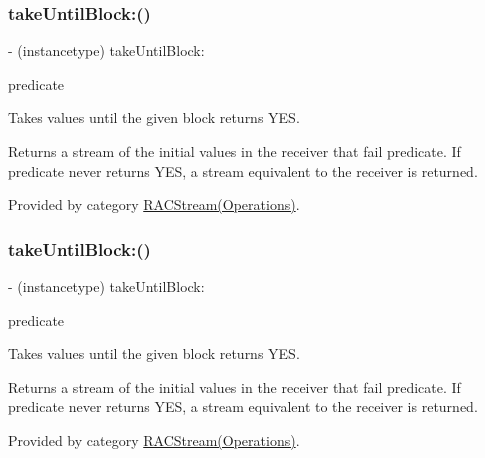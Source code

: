 \subsubsection{\texorpdfstring{take\+Until\+Block\+:()}{takeUntilBlock:()}\hspace{0.1cm}{\footnotesize\ttfamily [1/3]}}
{\footnotesize\ttfamily -\/ (instancetype) take\+Until\+Block\+: \begin{DoxyParamCaption}\item[{(B\+O\+OL($^\wedge$)(id x))}]{predicate }\end{DoxyParamCaption}}

Takes values until the given block returns {\ttfamily Y\+ES}.

Returns a stream of the initial values in the receiver that fail {\ttfamily predicate}. If {\ttfamily predicate} never returns {\ttfamily Y\+ES}, a stream equivalent to the receiver is returned. 

Provided by category \mbox{\hyperlink{category_r_a_c_stream_07_operations_08_ac19d57150840e93112646eef310c2489}{R\+A\+C\+Stream(\+Operations)}}.

\mbox{\label{interface_r_a_c_stream_ac19d57150840e93112646eef310c2489}} 
\subsubsection{\texorpdfstring{take\+Until\+Block\+:()}{takeUntilBlock:()}\hspace{0.1cm}{\footnotesize\ttfamily [2/3]}}
{\footnotesize\ttfamily -\/ (instancetype) take\+Until\+Block\+: \begin{DoxyParamCaption}\item[{(B\+O\+OL($^\wedge$)(id x))}]{predicate }\end{DoxyParamCaption}}

Takes values until the given block returns {\ttfamily Y\+ES}.

Returns a stream of the initial values in the receiver that fail {\ttfamily predicate}. If {\ttfamily predicate} never returns {\ttfamily Y\+ES}, a stream equivalent to the receiver is returned. 

Provided by category \mbox{\hyperlink{category_r_a_c_stream_07_operations_08_ac19d57150840e93112646eef310c2489}{R\+A\+C\+Stream(\+Operations)}}.


